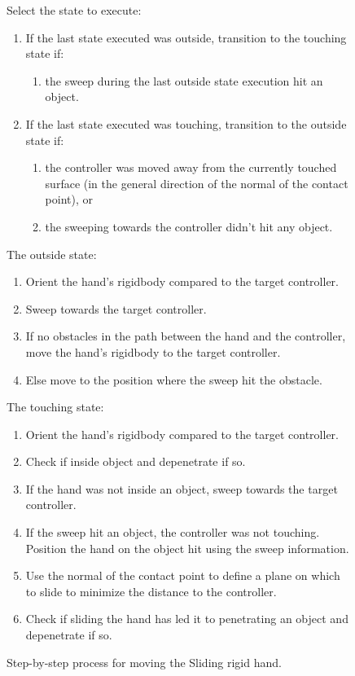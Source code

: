 \begin{figure}[H]
\small
Select the state to execute:
\begin{enumerate}[noitemsep,label=\alph*.]
\item If the last state executed was outside, transition to the touching state if:
\begin{enumerate}[noitemsep,label=\arabic*.]
\item the sweep during the last outside state execution hit an object.
\end{enumerate}
\item If the last state executed was touching, transition to the outside state if:
\begin{enumerate}[noitemsep,label=\arabic*.]
\item the controller was moved away from the currently touched surface (in the general direction of the normal of the contact point), or
\item the sweeping towards the controller didn't hit any object.
\end{enumerate}
\end{enumerate}
\begin{minipage}[t]{0.49\textwidth}
\small
The outside state:
\begin{enumerate}[noitemsep]
\item Orient the hand's rigidbody compared to the target controller.
\item Sweep towards the target controller.
\item If no obstacles in the path between the hand and the controller, move the hand's rigidbody to the target controller.
\item Else move to the position where the sweep hit the obstacle.
\end{enumerate}
\end{minipage}
\hspace{2em}%
\begin{minipage}[t]{0.49\textwidth}
\small
The touching state:
\begin{enumerate}[noitemsep]
\item Orient the hand's rigidbody compared to the target controller.
\item Check if inside object and depenetrate if so.
\item If the hand was not inside an object, sweep towards the target controller.
\item If the sweep hit an object, the controller was not touching. Position the hand on the object hit using the sweep information.
\item Use the normal of the contact point to define a plane on which to slide to minimize the distance to the controller.
\item Check if sliding the hand has led it to penetrating an object and depenetrate if so.
\end{enumerate}
\end{minipage}
\caption{Step-by-step process for moving the Sliding rigid hand.}
\label{fig:stepByStepSlidingRigidHand}
\end{figure}

